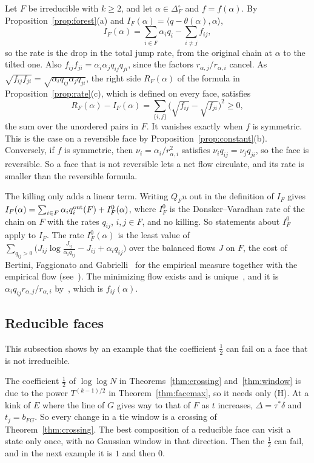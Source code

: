 \begin{remark}\label{rem:flows}
Let $F$ be irreducible with $k\ge2$, and let $\alpha\in\Delta_F^\circ$ and
$f=f(\alpha)$. By Proposition~\ref{prop:forest}(a) and
$I_F(\alpha)=\langle q-\theta(\alpha),\alpha\rangle$,
\[
I_F(\alpha)=\sum_{i\in F}\alpha_iq_i-\sum_{i\ne j}f_{ij},
\]
so the rate is the drop in the total jump rate, from the original chain at $\alpha$ to the
tilted one. Also $f_{ij}f_{ji}=\alpha_i\alpha_jq_{ij}q_{ji}$, since the factors
$r_{\alpha,j}/r_{\alpha,i}$ cancel. As $\sqrt{f_{ij}f_{ji}}=\sqrt{\alpha_iq_{ij}\alpha_jq_{ji}}$,
the right side $R_F(\alpha)$ of the formula in Proposition~\ref{prop:rate}(c), which is
defined on every face, satisfies
\[
R_F(\alpha)-I_F(\alpha)=\sum_{\{i,j\}}\bigl(\sqrt{f_{ij}}-\sqrt{f_{ji}}\bigr)^2\ge0,
\]
the sum over the unordered pairs in $F$. It vanishes exactly when $f$ is symmetric. This is the
case on a reversible face by Proposition~\ref{prop:constant}(b). Conversely, if $f$ is symmetric,
then $\nu_i=\alpha_i/r_{\alpha,i}^2$ satisfies $\nu_iq_{ij}=\nu_jq_{ji}$, so the face is reversible.
So a face that is not reversible lets a net flow circulate, and its rate is smaller than the
reversible formula.

The killing only adds a linear term. Writing $Q_Fu$ out in the definition of $I_F$ gives
$I_F(\alpha)=\sum_{i\in F}\alpha_iq_i^{\rm out}(F)+I^0_F(\alpha)$, where $I^0_F$ is the
Donsker--Varadhan rate of the chain on $F$ with the rates $q_{ij}$, $i,j\in F$, and no
killing. So statements about $I^0_F$ apply to $I_F$. The rate $I^0_F(\alpha)$ is the least
value of $\sum_{q_{ij}>0}\bigl(J_{ij}\log\frac{J_{ij}}{\alpha_iq_{ij}}-J_{ij}+\alpha_iq_{ij}\bigr)$
over the balanced flows $J$ on $F$, the cost of Bertini, Faggionato and
Gabrielli~\cite{bfg2015} for the empirical measure together with the empirical flow
(see~\cite[(1.3) to (1.7)]{kl2024}). The minimizing flow exists and is
unique~\cite[Theorem~1.6]{bfg2014}, and it is $\alpha_iq_{ij}r_{\alpha,j}/r_{\alpha,i}$
by~\cite[Lemma~5.7]{kl2024}, which is $f_{ij}(\alpha)$.
\end{remark}

\subsection{Reducible faces}\label{sec:reducible}

This subsection shows by an example that the coefficient $\frac12$ can fail on a face that is
not irreducible.

\begin{remark}\label{rem:half}
The coefficient $\frac12$ of $\log\log N$ in Theorems~\ref{thm:crossing} and~\ref{thm:window} is
due to the power $T^{(k-1)/2}$ in Theorem~\ref{thm:facemax}, so it needs only (H). At a kink of
$E$ where the line of $G$ gives way to that of $F$ as $t$ increases, $\Delta=\tau^*\delta$ and
$t_j=b_{FG}$. So every change in a tie window is a crossing of Theorem~\ref{thm:crossing}. The
best composition of a reducible face can visit a state only once,
with no Gaussian window in that direction. Then the $\frac12$ can fail, and in the next example it
is $1$ and then $0$.
\end{remark}

